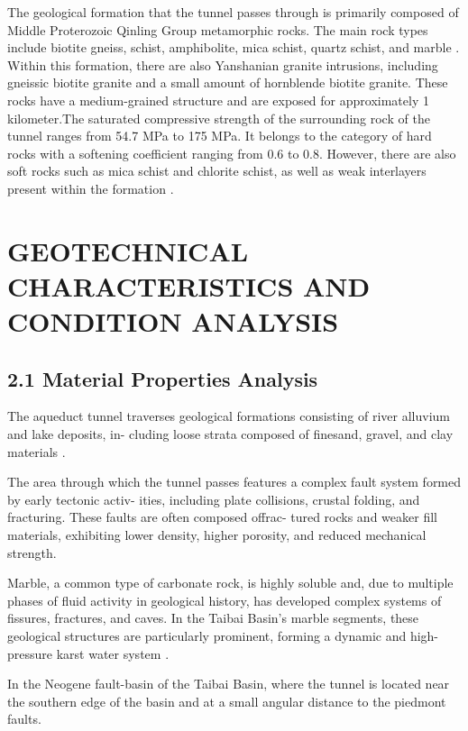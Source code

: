\documentclass[11pt]{article}
\newcommand{\sectiontitle}[1]{\noindent\textbf{\MakeUppercase{#1}}}
\newcommand{\firstletter}[1]{\textbf{\fontsize{14}{17}\selectfont #1}}
\begin{document}
The geological formation that the tunnel passes through is primarily composed of Middle Proterozoic Qinling Group metamorphic rocks. The main rock types include biotite gneiss, schist, amphibolite, mica schist, quartz schist, and marble \parencite{bib8}. Within this formation, there are also Yanshanian granite intrusions, including gneissic biotite granite and a small amount of hornblende biotite granite. These rocks have a medium-grained structure and are exposed for approximately 1 kilometer.The saturated compressive strength of the surrounding rock of the tunnel ranges from 54.7 MPa to 175 MPa. It belongs to the category of hard rocks with a softening coefficient ranging from 0.6 to 0.8. However, there are also soft rocks such as mica schist and chlorite schist, as well as weak interlayers present within the formation \parencite{bib4}.

\section*{\sectiontitle{\firstletter{2} \hspace{0.1cm} \firstletter{G}eotechnical \firstletter{C}haracteristics and \firstletter{C}ondition \firstletter{A}nalysis}}

\subsection*{2.1 Material Properties Analysis}

The aqueduct tunnel traverses geological formations consisting of river alluvium and lake deposits, in- cluding loose strata composed of finesand, gravel, and clay materials \parencite{bib1}.

The area through which the tunnel passes features a complex fault system formed by early tectonic activ- ities, including plate collisions, crustal folding, and fracturing. These faults are often composed offrac- tured rocks and weaker fill materials, exhibiting lower density, higher porosity, and reduced mechanical strength. 

Marble, a common type of carbonate rock, is highly soluble and, due to multiple phases of fluid activity in geological history, has developed complex systems of fissures, fractures, and caves.  In the Taibai Basin’s marble segments, these geological structures are particularly prominent, forming a dynamic and high-pressure karst water system \parencite{bib5}. 

In the Neogene fault-basin of the Taibai Basin, where the tunnel is located near the southern edge of the basin and at a small angular distance to the piedmont faults.
\end{document}

